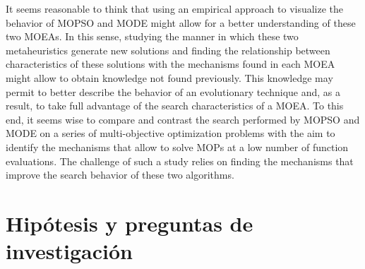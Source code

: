 It seems reasonable to think that using an empirical approach to visualize the behavior of MOPSO and MODE might allow for a better understanding of these two MOEAs. In this sense, studying the manner in which these two metaheuristics generate new solutions and finding the relationship between characteristics of these solutions with the mechanisms found in each MOEA might allow to obtain knowledge not found previously. This knowledge may permit to better describe the behavior of an evolutionary technique and, as a result, to take full advantage of the search characteristics of a MOEA. To this end, it seems wise to compare and contrast the search performed by MOPSO and MODE on a series of multi-objective optimization problems with the aim to identify the mechanisms that allow to solve MOPs at a low number of function evaluations. The challenge of such a study relies on finding the mechanisms that improve the search behavior of these two algorithms.


\section{Hipótesis y preguntas de investigación}


